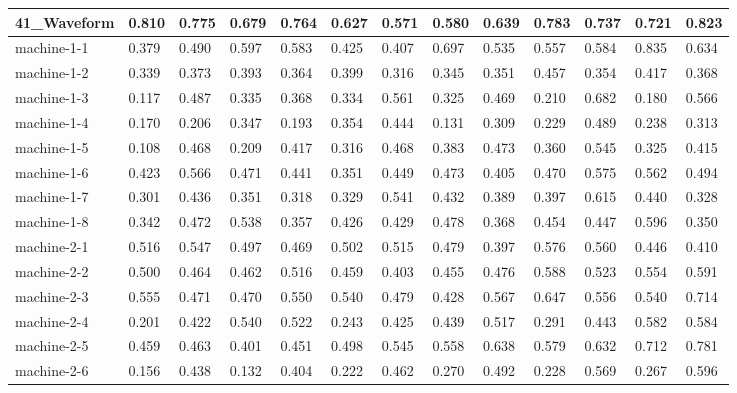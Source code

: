 \begin{table}[]
{\begin{tabular}{|l||l|l|l|l||l|l|l|l||l|l|l|l|}
			\hline
			41\_Waveform    & 0.810  & 0.775 & 0.679 & 0.764 & 0.627  & 0.571 & 0.580 & 0.639 & 0.783  & 0.737        & 0.721 & 0.823 \\ 
			\hline
			machine-1-1     & 0.379  & 0.490 & 0.597 & 0.583 & 0.425  & 0.407 & 0.697 & 0.535 & 0.557  & 0.584        & 0.835 & 0.634 \\ 
			\hline
			machine-1-2     & 0.339  & 0.373 & 0.393 & 0.364 & 0.399  & 0.316 & 0.345 & 0.351 & 0.457  & 0.354        & 0.417 & 0.368 \\ 
			\hline
			machine-1-3     & 0.117  & 0.487 & 0.335 & 0.368 & 0.334  & 0.561 & 0.325 & 0.469 & 0.210  & 0.682        & 0.180 & 0.566 \\ 
			\hline
			machine-1-4     & 0.170  & 0.206 & 0.347 & 0.193 & 0.354  & 0.444 & 0.131 & 0.309 & 0.229  & 0.489        & 0.238 & 0.313 \\ 
			\hline
			machine-1-5     & 0.108  & 0.468 & 0.209 & 0.417 & 0.316  & 0.468 & 0.383 & 0.473 & 0.360  & 0.545        & 0.325 & 0.415 \\ 
			\hline
			machine-1-6     & 0.423  & 0.566 & 0.471 & 0.441 & 0.351  & 0.449 & 0.473 & 0.405 & 0.470  & 0.575        & 0.562 & 0.494 \\ 
			\hline
			machine-1-7     & 0.301  & 0.436 & 0.351 & 0.318 & 0.329  & 0.541 & 0.432 & 0.389 & 0.397  & 0.615        & 0.440 & 0.328 \\ 
			\hline
			machine-1-8     & 0.342  & 0.472 & 0.538 & 0.357 & 0.426  & 0.429 & 0.478 & 0.368 & 0.454  & 0.447        & 0.596 & 0.350 \\ 
			\hline
			machine-2-1     & 0.516  & 0.547 & 0.497 & 0.469 & 0.502  & 0.515 & 0.479 & 0.397 & 0.576  & 0.560        & 0.446 & 0.410 \\ 
			\hline
			machine-2-2     & 0.500  & 0.464 & 0.462 & 0.516 & 0.459  & 0.403 & 0.455 & 0.476 & 0.588  & 0.523        & 0.554 & 0.591 \\ 
			\hline
			machine-2-3     & 0.555  & 0.471 & 0.470 & 0.550 & 0.540  & 0.479 & 0.428 & 0.567 & 0.647  & 0.556        & 0.540 & 0.714 \\ 
			\hline
			machine-2-4     & 0.201  & 0.422 & 0.540 & 0.522 & 0.243  & 0.425 & 0.439 & 0.517 & 0.291  & 0.443        & 0.582 & 0.584 \\ 
			\hline
			machine-2-5     & 0.459  & 0.463 & 0.401 & 0.451 & 0.498  & 0.545 & 0.558 & 0.638 & 0.579  & 0.632        & 0.712 & 0.781 \\ 
			\hline
			machine-2-6     & 0.156  & 0.438 & 0.132 & 0.404 & 0.222  & 0.462 & 0.270 & 0.492 & 0.228  & 0.569        & 0.267 & 0.596 \\ 

\end{tabular}}
\end{table}
